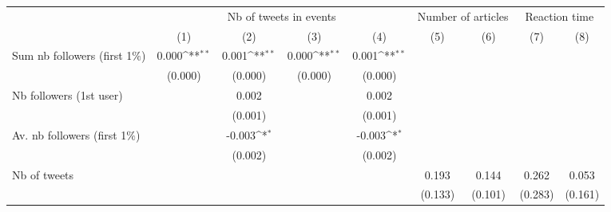 {
\def\sym#1{\ifmmode^{#1}\else\(^{#1}\)\fi}
\begin{tabular}{l*{8}{c}}
\hline\hline
                    &\multicolumn{4}{c}{Nb of tweets in events}                                             &\multicolumn{2}{c}{Number of articles}     &\multicolumn{2}{c}{Reaction time}          \\\cmidrule(lr){2-5}\cmidrule(lr){6-7}\cmidrule(lr){8-9}
                    &\multicolumn{1}{c}{(1)}         &\multicolumn{1}{c}{(2)}         &\multicolumn{1}{c}{(3)}         &\multicolumn{1}{c}{(4)}         &\multicolumn{1}{c}{(5)}         &\multicolumn{1}{c}{(6)}         &\multicolumn{1}{c}{(7)}         &\multicolumn{1}{c}{(8)}         \\
\hline
Sum nb followers (first 1$\%$)&       0.000\sym{**} &       0.001\sym{**} &       0.000\sym{**} &       0.001\sym{**} &                     &                     &                     &                     \\
                    &     (0.000)         &     (0.000)         &     (0.000)         &     (0.000)         &                     &                     &                     &                     \\
Nb followers (1st user)&                     &       0.002         &                     &       0.002         &                     &                     &                     &                     \\
                    &                     &     (0.001)         &                     &     (0.001)         &                     &                     &                     &                     \\
Av. nb followers (first 1$\%$)&                     &      -0.003\sym{*}  &                     &      -0.003\sym{*}  &                     &                     &                     &                     \\
                    &                     &     (0.002)         &                     &     (0.002)         &                     &                     &                     &                     \\
Nb of tweets        &                     &                     &                     &                     &       0.193         &       0.144         &       0.262         &       0.053         \\
                    &                     &                     &                     &                     &     (0.133)         &     (0.101)         &     (0.283)         &     (0.161)         \\

\end{tabular}}
